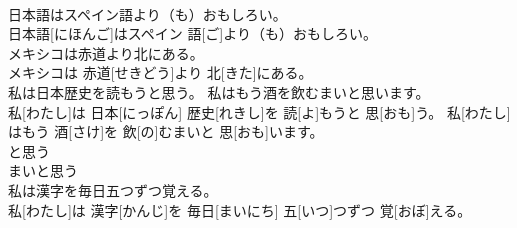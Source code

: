 \documentclass[8pt]{extreport}
\begin{document}
\begin{CJK}{UTF8}{min}
\\	日本語はスペイン語より（も）おもしろい。	
\\	日本語[にほんご]はスペイン 語[ご]より（も）おもしろい。	
\\	メキシコは赤道より北にある。	
\\	メキシコは 赤道[せきどう]より 北[きた]にある。	
\\	私は日本歴史を読もうと思う。 私はもう酒を飲むまいと思います。	
\\	私[わたし]は 日本[にっぽん] 歴史[れきし]を 読[よ]もうと 思[おも]う。 私[わたし]はもう 酒[さけ]を 飲[の]むまいと 思[おも]います。	
\\	と思う 
\\	まいと思う	
\\	私は漢字を毎日五つずつ覚える。	
\\	私[わたし]は 漢字[かんじ]を 毎日[まいにち] 五[いつ]つずつ 覚[おぼ]える。	
\end{CJK}
\end{document}
